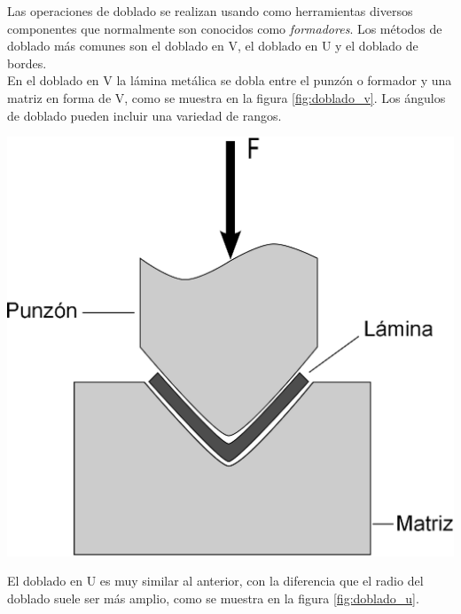 Las operaciones de doblado se realizan usando como herramientas diversos componentes 
que normalmente son conocidos como \textit{formadores}. Los métodos de doblado más 
comunes son el doblado en V, el doblado en U y el doblado de bordes.\\

En el doblado en V la lámina metálica se dobla entre el punzón o formador y una matriz 
en forma de V, como se muestra en la figura \ref{fig:doblado_v}. Los ángulos de doblado 
pueden incluir una variedad de rangos.

\begin{center}
\includegraphics[scale=0.4]{src/ch2/doblado_v.eps}
\label{fig:doblado_v}
\end{center}

El doblado en U es muy similar al anterior, con la diferencia que el radio del doblado 
suele ser más amplio, como se muestra en la figura \ref{fig:doblado_u}.

